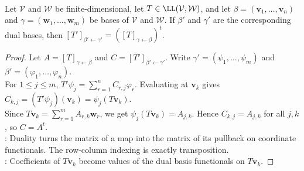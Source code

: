 \begin{theorem} \label{thm:matrix-of-dual-map-is-transpose} \\
Let $\mathcal{V}$ and $\mathcal{W}$ be finite-dimensional, let $T\in\LL(\mathcal{V},\mathcal{W})$, and let $\beta=(\mathbf{v}_1,\ldots,\mathbf{v}_n)$ and $\gamma=(\mathbf{w}_1,\ldots,\mathbf{w}_m)$ be bases of $\mathcal{V}$ and $\mathcal{W}$. If $\beta'$ and $\gamma'$ are the corresponding dual bases, then $[T']_{\beta'\leftarrow\gamma'}=\left([T]_{\gamma\leftarrow\beta}\right)^t$.
\begin{proof}
Let $A=[T]_{\gamma\leftarrow\beta}$ and $C=[T']_{\beta'\leftarrow\gamma'}$. Write $\gamma'=(\psi_1,\ldots,\psi_m)$ and $\beta'=(\varphi_1,\ldots,\varphi_n)$.\\
For $1\leq j\leq m$, $T'\psi_j=\sum\limits_{r=1}^n C_{r,j}\varphi_r$.
Evaluating at $\mathbf{v}_k$ gives $C_{k,j}=(T'\psi_j)(\mathbf{v}_k)=\psi_j(T\mathbf{v}_k)$.\\
Since $T\mathbf{v}_k=\sum\limits_{r=1}^m A_{r,k}\mathbf{w}_r$, we get $\psi_j(T\mathbf{v}_k)=A_{j,k}$. Hence $C_{k,j}=A_{j,k}$ for all $j,k$, so $C=A^t$.\\
: Duality turns the matrix of a map into the matrix of its pullback on coordinate functionals. The row-column indexing is exactly transposition.\\
: Coefficients of $T\mathbf{v}_k$ become values of the dual basis functionals on $T\mathbf{v}_k$.
\end{proof}
\end{theorem}

